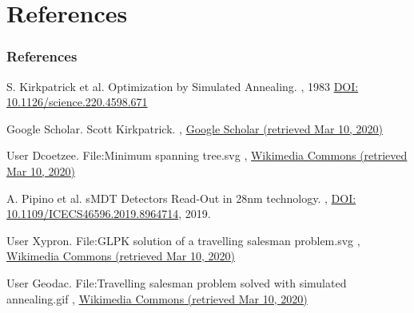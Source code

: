 \documentclass[aspectratio=43]{beamer}
\begin{document}
	\section*{References}
		\begin{frame}[allowframebreaks]
			\frametitle{References}
			\begin{thebibliography}{10}
				

			
				
				\beamertemplatearticlebibitems
			
					S. Kirkpatrick et al.
					\newblock Optimization by Simulated Annealing.
					, 1983
					\newblock \href{hhttps://www.jstor.org/stable/1690046}{DOI: 10.1126/science.220.4598.671}

					Google Scholar.
					\newblock Scott Kirkpatrick.		
					, \href{https://scholar.google.com/citations?user=qlKWTsUAAAAJ&hl=en&oi=sra}{Google Scholar (retrieved Mar 10, 2020)}

					User Dcoetzee.
					\newblock File:Minimum spanning tree.svg
					, \href{https://commons.wikimedia.org/wiki/File:Minimum_spanning_tree.svg}{Wikimedia Commons (retrieved Mar 10, 2020)}

					A. Pipino et al.
					\newblock sMDT Detectors Read-Out in 28nm technology.
					, \href{https://www.researchgate.net/publication/338795012_sMDT_Detectors_Read-Out_in_28nm_technology}{DOI: 10.1109/ICECS46596.2019.8964714},
					2019.

					User Xypron.
					\newblock File:GLPK solution of a travelling salesman problem.svg
					, \href{https://commons.wikimedia.org/wiki/File:GLPK_solution_of_a_travelling_salesman_problem.svg}{Wikimedia Commons (retrieved Mar 10, 2020)}

					User Geodac.
					\newblock File:Travelling salesman problem solved with simulated annealing.gif
					, \href{https://commons.wikimedia.org/wiki/File:Travelling_salesman_problem_solved_with_simulated_annealing.gif}{Wikimedia Commons (retrieved Mar 10, 2020)}
			\end{thebibliography}
		\end{frame}
\end{document}
